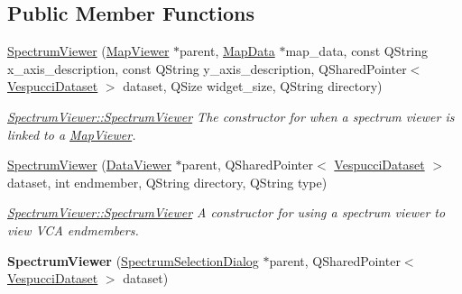 \subsection*{Public Member Functions}
\begin{DoxyCompactItemize}
\item 
\hyperlink{class_spectrum_viewer_a55a3c332d6c0a2c98a1885fd35194064}{Spectrum\+Viewer} (\hyperlink{class_map_viewer}{Map\+Viewer} $\ast$parent, \hyperlink{class_map_data}{Map\+Data} $\ast$map\+\_\+data, const Q\+String x\+\_\+axis\+\_\+description, const Q\+String y\+\_\+axis\+\_\+description, Q\+Shared\+Pointer$<$ \hyperlink{class_vespucci_dataset}{Vespucci\+Dataset} $>$ dataset, Q\+Size widget\+\_\+size, Q\+String directory)
\begin{DoxyCompactList}\small\item\em \hyperlink{class_spectrum_viewer_a55a3c332d6c0a2c98a1885fd35194064}{Spectrum\+Viewer\+::\+Spectrum\+Viewer} The constructor for when a spectrum viewer is linked to a \hyperlink{class_map_viewer}{Map\+Viewer}. \end{DoxyCompactList}\item 
\hyperlink{class_spectrum_viewer_a73bcfd2a82ca275f3c387e40737d21a1}{Spectrum\+Viewer} (\hyperlink{class_data_viewer}{Data\+Viewer} $\ast$parent, Q\+Shared\+Pointer$<$ \hyperlink{class_vespucci_dataset}{Vespucci\+Dataset} $>$ dataset, int endmember, Q\+String directory, Q\+String type)
\begin{DoxyCompactList}\small\item\em \hyperlink{class_spectrum_viewer_a55a3c332d6c0a2c98a1885fd35194064}{Spectrum\+Viewer\+::\+Spectrum\+Viewer} A constructor for using a spectrum viewer to view V\+C\+A endmembers. \end{DoxyCompactList}\item 
\hypertarget{class_spectrum_viewer_a734548147baeb9247d339bfa8225a707}{{\bfseries Spectrum\+Viewer} (\hyperlink{class_spectrum_selection_dialog}{Spectrum\+Selection\+Dialog} $\ast$parent, Q\+Shared\+Pointer$<$ \hyperlink{class_vespucci_dataset}{Vespucci\+Dataset} $>$ dataset)}\label{class_spectrum_viewer_a734548147baeb9247d339bfa8225a707}


\end{DoxyCompactItemize}
